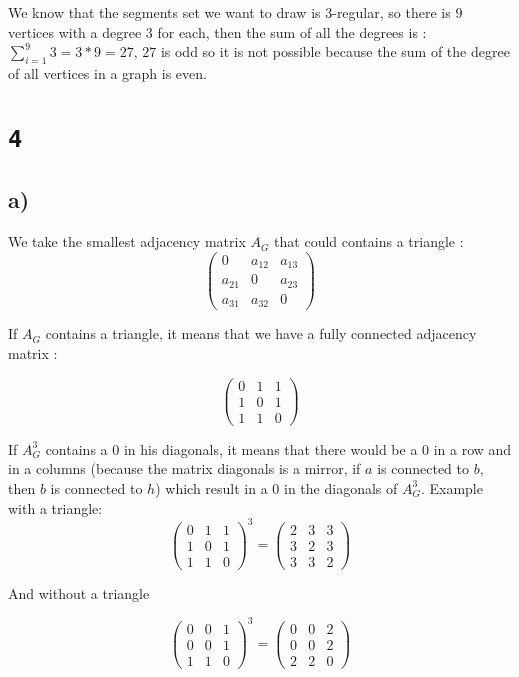\documentclass[a4paper,11pt]{report}
\begin{document}
We know that the segments set we want to draw is $3$-regular, so there is $9$
vertices with a degree $3$ for each, then the sum of all the degrees is :
$\sum_{i=1}^9 3 = 3*9 = 27$, $27$ is odd so it is not possible because the sum
of the degree of all vertices in a graph is even.

\section*{\texttt{4}}

\subsection*{a)}

We take the smallest adjacency matrix $A_G$ that could contains a triangle :
\[
\begin{pmatrix}
0 & a_{12} & a_{13} \\
a_{21} & 0 & a_{23} \\
a_{31} & a_{32} & 0
\end{pmatrix}
\]

If $A_G$ contains a triangle, it means that we have a fully connected adjacency
matrix :

\[
\begin{pmatrix}
0 & 1 & 1 \\
1 & 0 & 1 \\
1 & 1 & 0
\end{pmatrix}
\]

If $A_G^3$ contains a $0$ in his diagonals, it means that there would be a $0$
in a row and in a columns (because the matrix diagonals is a mirror, if $a$ is
connected to $b$, then $b$ is connected to $h$) which result in a $0$ in the
diagonals of $A_G^3$. Example with a triangle:
\[
\begin{pmatrix}
0 & 1 & 1 \\
1 & 0 & 1 \\
1 & 1 & 0
\end{pmatrix}^3 =
\begin{pmatrix}
2 & 3 & 3 \\
3 & 2 & 3 \\
3 & 3 & 2
\end{pmatrix}
\]

And without a triangle

\[
\begin{pmatrix}
0 & 0 & 1 \\
0 & 0 & 1 \\
1 & 1 & 0
\end{pmatrix}^3 =
\begin{pmatrix}
0 & 0 & 2 \\
0 & 0 & 2 \\
2 & 2 & 0
\end{pmatrix}
\]
\end{document}

